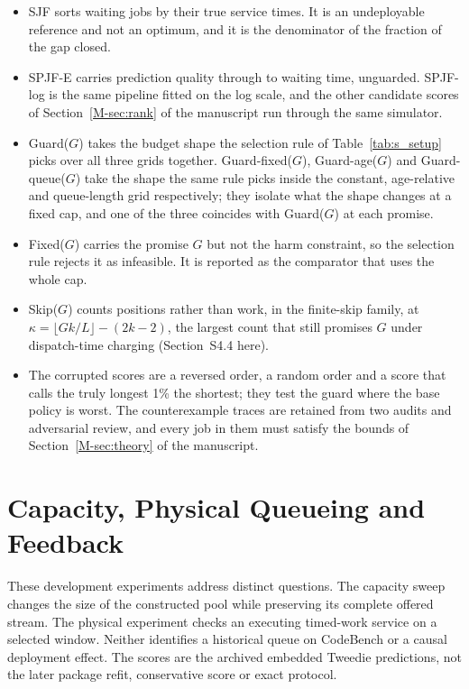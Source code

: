 \documentclass[mathematics,supfile,submit,moreauthors]{Definitions/mdpi}
\newcommand{\devnum}[1]{#1}
\begin{document}
\begin{itemize}
\item SJF sorts waiting jobs by their true service times. It is an undeployable
  reference and not an optimum, and it is the denominator of the fraction of the gap
  closed.
\item SPJF-E carries prediction quality through to waiting time, unguarded. SPJF-log
  is the same pipeline fitted on the log scale, and the other candidate scores of
  Section~\ref*{M-sec:rank} of the manuscript run through the same simulator.
\item Guard($G$) takes the budget shape the selection rule of Table~\ref{tab:s_setup}
  picks over all three grids together. Guard-fixed($G$), Guard-age($G$) and
  Guard-queue($G$) take the shape the same rule picks inside the constant,
  age-relative and queue-length grid respectively; they isolate what the shape changes
  at a fixed cap, and one of the three coincides with Guard($G$) at each promise.
\item Fixed($G$) carries the promise $G$ but not the harm constraint, so the selection
  rule rejects it as infeasible. It is reported as the comparator that uses the whole
  cap.
\item Skip($G$) counts positions rather than work, in the finite-skip family, at
  $\kappa = \lfloor Gk/L \rfloor - (2k-2)$, the largest count that still promises $G$
  under dispatch-time charging (Section~S4.4 here).
\item The corrupted scores are a reversed order, a random order and a score that calls
  the truly longest \devnum{1\%} the shortest; they test the guard where the base policy
  is worst. The counterexample traces are retained from two audits and adversarial
  review, and every job in them must satisfy the bounds of Section~\ref*{M-sec:theory} of the manuscript.
\end{itemize}

\section{Capacity, Physical Queueing and Feedback}
\label{sec:supp_physical}

These development experiments address distinct questions. The capacity sweep changes
the size of the constructed pool while preserving its complete offered stream. The
physical experiment checks an executing timed-work service on a selected window.
Neither identifies a historical queue on CodeBench or a causal deployment effect.
The scores are the archived embedded Tweedie predictions, not the later package
refit, conservative score or exact protocol.
\end{document}
